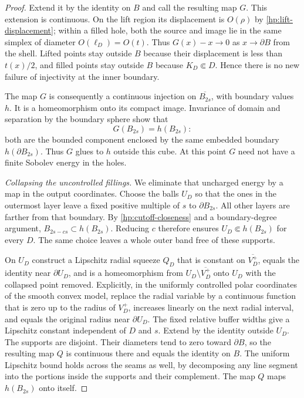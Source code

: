 \begin{proof}
Extend it by the identity on $B$ and call the resulting map $G$.
This extension is continuous.  On the lift region its displacement
is $O(\rho)$ by \eqref{hp:lift-displacement}; within a filled hole,
both the source and image lie in the same simplex of diameter
$O(\ell_D)=O(t)$.  Thus $G(x)-x\to0$ as $x\to\partial B$ from the
shell.  Lifted points stay outside $B$ because their displacement is
less than $t(x)/2$, and filled points stay outside $B$ because
$K_D\Subset D$.  Hence there is no new failure of injectivity at
the inner boundary.

The map $G$ is consequently a continuous injection on
$\overline{B_{2s}}$, with boundary values $h$.  It is a homeomorphism
onto its compact image.  Invariance of domain and separation by the
boundary sphere show that
\[
 G(B_{2s})=h(B_{2s}):
\]
both are the bounded component enclosed by the same embedded boundary
$h(\partial B_{2s})$.  Thus $G$ glues to $h$ outside this cube.  At
this point $G$ need not have a finite Sobolev energy in the holes.

\emph{Collapsing the uncontrolled fillings.}
We eliminate that uncharged energy by a map in the output coordinates.
Choose the balls $U_D$ so that the ones in the outermost layer leave
a fixed positive multiple of $s$ to $\partial B_{2s}$.  All other
layers are farther from that boundary.  By
\eqref{hp:cutoff-closeness} and a boundary-degree argument,
$B_{2s-cs}\subset h(B_{2s})$.  Reducing $c$ therefore ensures
$U_D\Subset h(B_{2s})$ for every $D$.  The same choice leaves a
whole outer band free of these supports.

On $U_D$ construct a Lipschitz radial squeeze $Q_D$ that is constant
on $\overline{V_D^+}$, equals the identity near $\partial U_D$, and
is a homeomorphism from
$U_D\setminus\overline{V_D^+}$ onto $U_D$ with the collapsed point
removed.  Explicitly, in the uniformly controlled polar coordinates
of the smooth convex model, replace the radial variable by a
continuous function that is zero up to the radius of $V_D^+$,
increases linearly on the next radial interval, and equals the
original radius near $\partial U_D$.  The fixed relative buffer
widths give a Lipschitz constant independent of $D$ and $s$.
Extend by the identity outside $U_D$.  The supports are disjoint.
Their diameters tend to zero toward $\partial B$, so the resulting
map $Q$ is continuous there and equals the identity on $B$.
The uniform Lipschitz bound holds across the seams as well, by
decomposing any line segment into the portions inside the supports
and their complement.  The map $Q$ maps $h(B_{2s})$ onto itself.


\end{proof}
